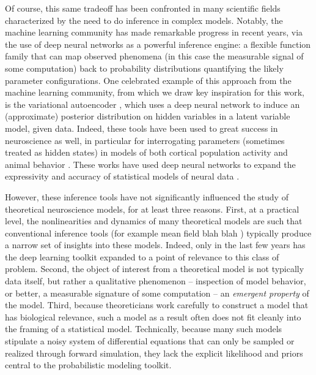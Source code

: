 \documentclass[11pt]{article}
\begin{document}
Of course, this same tradeoff has been confronted in many scientific fields characterized by the need to do inference in complex models.  
Notably, the machine learning community has made remarkable progress in recent years, via the use of deep neural networks as a powerful inference engine: a flexible function family that can map observed phenomena (in this case the measurable signal of some computation) back to probability distributions quantifying the likely parameter configurations.  
One celebrated example of this approach from the machine learning community, from which we draw key inspiration for this work, is the variational autoencoder \cite{kingma2013auto, rezende2015variational, not this one; cite the rezende and mohamed vae one from 2013}, which uses a deep neural network to induce an (approximate) posterior distribution on hidden variables in a latent variable model, given data. 
Indeed, these tools have been used to great success in neuroscience as well, in particular for interrogating parameters (sometimes treated as hidden states) in models of both cortical population activity \cite{gao2016linear, zhao2017recursive, barello2018sparse, pandarinath2018inferring} and animal behavior \cite{wiltschko2015mapping, johnson2016composing, batty2019behavenet}. 
These works have used deep neural networks to expand the expressivity and accuracy of statistical models of neural data \cite{paninski2018neural}. 

However, these inference tools have not significantly influenced the study of theoretical neuroscience models, for at least three reasons.  
First, at a practical level, the nonlinearities and dynamics of many theoretical models are such that conventional inference tools (for example mean field blah blah \cite{???}) typically produce a narrow set of insights into these models.  
Indeed, only in the last few years has the deep learning toolkit expanded to a point of relevance to this class of problem.
Second, the object of interest from a theoretical model is not typically data itself, but rather a qualitative phenomenon -- inspection of model behavior, or better, a measurable signature of some computation -- an \emph{emergent property} of the model.  
Third, because theoreticians work carefully to construct a model that has biological relevance, such a model as a result often does not fit cleanly into the framing of a statistical model.  
Technically, because many such models stipulate a noisy system of differential equations that can only be sampled or realized through forward simulation, they lack the explicit likelihood and priors central to the probabilistic modeling toolkit.  
\end{document}
